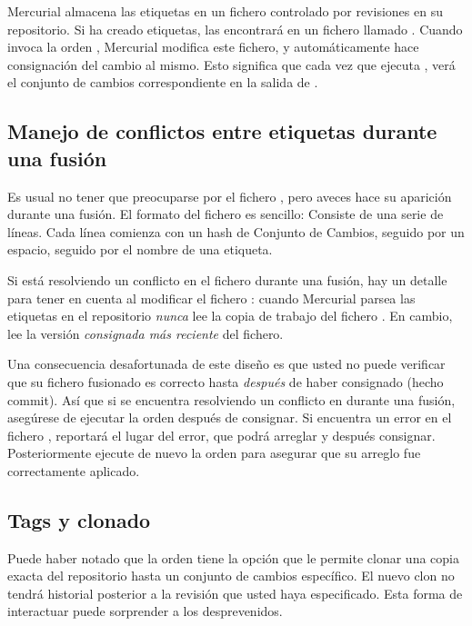 Mercurial almacena las etiquetas en un fichero controlado por revisiones en
su repositorio. Si ha creado etiquetas, las encontrará en un fichero
llamado .  Cuando invoca la orden ,
Mercurial modifica este fichero, y automáticamente hace consignación del
cambio al mismo.  Esto significa que cada vez que ejecuta ,
verá el conjunto de cambios correspondiente en la salida de .

\subsection{Manejo de conflictos entre etiquetas durante una fusión}

Es usual no tener que preocuparse por el fichero ,
pero aveces hace su aparición durante una fusión. El formato del
fichero es sencillo: Consiste de una serie de líneas. Cada línea
comienza con un hash de Conjunto de Cambios, seguido por un espacio,
seguido por el nombre de una etiqueta.

Si está resolviendo un conflicto en el fichero 
durante una fusión, hay un detalle para tener en cuenta al modificar
el fichero :
cuando Mercurial parsea las etiquetas en el repositorio \emph{nunca}
lee la copia de trabajo del fichero .  En cambio,
lee la versión \emph{consignada más reciente} del fichero.

Una consecuencia desafortunada de este diseño es que usted no puede
verificar que su fichero  fusionado es correcto hasta
\emph{después} de haber consignado (hecho commit). Así que si se
encuentra resolviendo un conflicto en  durante una
fusión, asegúrese de ejecutar la orden  después de
consignar. Si encuentra un error en el fichero , 
reportará el lugar del error, que podrá arreglar y después
consignar. Posteriormente ejecute de nuevo la orden  para
asegurar que su arreglo fue correctamente aplicado.

\subsection{Tags y clonado}

Puede haber notado que la orden  tiene la opción
 que le permite clonar una copia exacta del
repositorio hasta un conjunto de cambios específico. El nuevo clon no
tendrá historial posterior a la revisión que usted haya
especificado. Esta forma de interactuar puede sorprender a los
desprevenidos.

